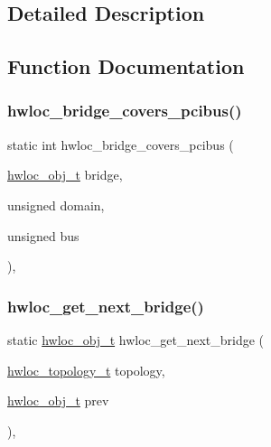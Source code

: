 \subsection{Detailed Description}


\subsection{Function Documentation}
\mbox{\label{a00204_ga0d92a9462a3d317f29ecb4442a307fb1}} 
\subsubsection{\texorpdfstring{hwloc\+\_\+bridge\+\_\+covers\+\_\+pcibus()}{hwloc\_bridge\_covers\_pcibus()}}
{\footnotesize\ttfamily static int hwloc\+\_\+bridge\+\_\+covers\+\_\+pcibus (\begin{DoxyParamCaption}\item[{\hyperlink{a00185_ga79b8ab56877ef99ac59b833203391c7d}{hwloc\+\_\+obj\+\_\+t}}]{bridge,  }\item[{unsigned}]{domain,  }\item[{unsigned}]{bus }\end{DoxyParamCaption})\hspace{0.3cm}{\ttfamily [inline]}, {\ttfamily [static]}}

\mbox{\label{a00204_ga9dba22a3f4f701f2a46780ba9a0bbbe7}} 
\subsubsection{\texorpdfstring{hwloc\+\_\+get\+\_\+next\+\_\+bridge()}{hwloc\_get\_next\_bridge()}}
{\footnotesize\ttfamily static \hyperlink{a00185_ga79b8ab56877ef99ac59b833203391c7d}{hwloc\+\_\+obj\+\_\+t} hwloc\+\_\+get\+\_\+next\+\_\+bridge (\begin{DoxyParamCaption}\item[{\hyperlink{a00186_ga9d1e76ee15a7dee158b786c30b6a6e38}{hwloc\+\_\+topology\+\_\+t}}]{topology,  }\item[{\hyperlink{a00185_ga79b8ab56877ef99ac59b833203391c7d}{hwloc\+\_\+obj\+\_\+t}}]{prev }\end{DoxyParamCaption})\hspace{0.3cm}{\ttfamily [inline]}, {\ttfamily [static]}}



